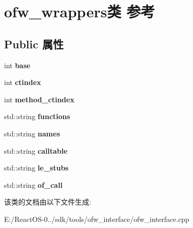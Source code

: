 \hypertarget{classofw__wrappers}{}\section{ofw\+\_\+wrappers类 参考}
\label{classofw__wrappers}
\subsection*{Public 属性}
\begin{DoxyCompactItemize}
\item 
\mbox{\label{classofw__wrappers_aa6848a3b9d9af8bad6309aef6f04474c}} 
int {\bfseries base}
\item 
\mbox{\label{classofw__wrappers_a1aeb1e5797fcd336503c4de795a0bbc4}} 
int {\bfseries ctindex}
\item 
\mbox{\label{classofw__wrappers_a3455549b3ae92ca8f126021bd0be0d58}} 
int {\bfseries method\+\_\+ctindex}
\item 
\mbox{\label{classofw__wrappers_a6f24b2bba8c7a8f89bad3fb5c1d2ed45}} 
std\+::string {\bfseries functions}
\item 
\mbox{\label{classofw__wrappers_a23abe9307b359439095f859514ab6293}} 
std\+::string {\bfseries names}
\item 
\mbox{\label{classofw__wrappers_a443516b74fe16a87a6cb7df308362b0b}} 
std\+::string {\bfseries calltable}
\item 
\mbox{\label{classofw__wrappers_a35572a5e720837d9fd3b8e46e0b7b252}} 
std\+::string {\bfseries le\+\_\+stubs}
\item 
\mbox{\label{classofw__wrappers_a636d7c45c0de89f7053cc533b8bdb494}} 
std\+::string {\bfseries of\+\_\+call}
\end{DoxyCompactItemize}


该类的文档由以下文件生成\+:\begin{DoxyCompactItemize}
\item 
E\+:/\+React\+O\+S-\/0../sdk/tools/ofw\+\_\+interface/ofw\+\_\+interface.\+cpp\end{DoxyCompactItemize}
